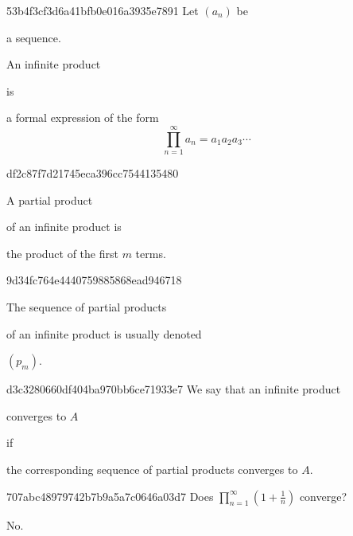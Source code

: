 \begin{note}{53b4f3cf3d6a41bfb0e016a3935e7891}
    Let \({ (a_n) }\) be \begin{icloze}{3}a sequence.\end{icloze}
    \begin{icloze}{2}An infinite product\end{icloze} is
    \begin{icloze}{1}
        a formal expression of the form
        \[
            \prod_{n = 1}^{\infty} a_n = a_1 a_2 a_3 \cdots
        \]
    \end{icloze}
\end{note}

\begin{note}{df2c87f7d21745eca396cc7544135480}
    \begin{icloze}{2}A partial product\end{icloze} of an infinite product is
    \begin{icloze}{1}
        the product of the first \({ m }\) terms.
    \end{icloze}
\end{note}

\begin{note}{9d34fc764e4440759885868ead946718}
    \begin{icloze}{2}The sequence of partial products\end{icloze} of an infinite product is usually denoted \begin{icloze}{1}\({ (p_m) }\).\end{icloze}
\end{note}

\begin{note}{d3c3280660df404ba970bb6ce71933e7}
    We say that an infinite product \begin{icloze}{2}converges to \({ A }\)\end{icloze} if \begin{icloze}{1}the corresponding sequence of partial products converges to \({ A }\).\end{icloze}
\end{note}

\begin{note}{707abc48979742b7b9a5a7c0646a03d7}
    Does \({ \displaystyle \prod_{n = 1}^{\infty} \left( 1 + \frac{1}{n} \right) }\) converge?

    \begin{cloze}{1}
        No.
    \end{cloze}
\end{note}

